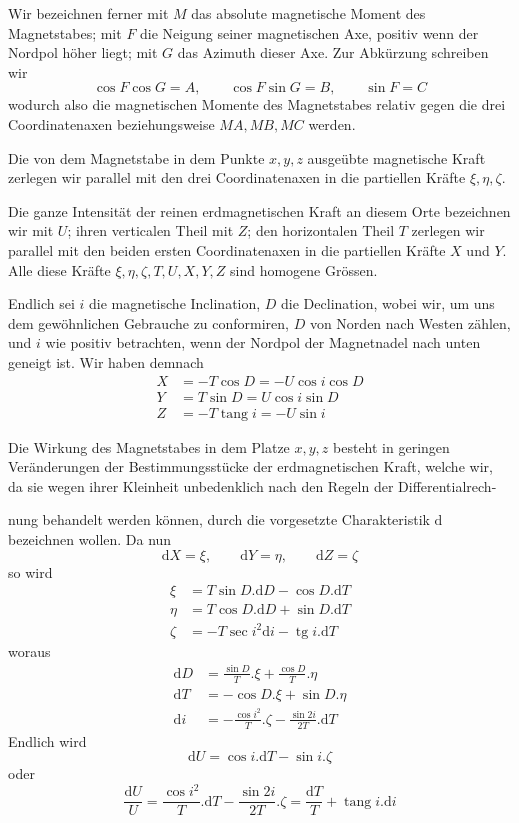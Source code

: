 Wir bezeichnen ferner mit $M$ das absolute magnetische Moment des Magnetstabes; mit $F$ die Neigung seiner magnetischen Axe, positiv wenn der Nordpol höher liegt; mit $G$ das Azimuth dieser Axe. Zur Abkürzung schreiben wir
\[
\cos F\cos G=A,\qquad\cos F\sin G=B,\qquad\sin F=C
\]
wodurch also die magnetischen Momente des Magnetstabes relativ gegen die drei Coordinatenaxen beziehungsweise $MA,MB,MC$ werden.

Die von dem Magnetstabe in dem Punkte $x,y,z$ ausgeübte magnetische Kraft zerlegen wir parallel mit den drei Coordinatenaxen in die partiellen Kräfte $\xi,\eta,\zeta$.

Die ganze Intensität der reinen erdmagnetischen Kraft an diesem Orte bezeichnen wir mit $U$; ihren verticalen Theil mit $Z$; den horizontalen Theil $T$ zerlegen wir parallel mit den beiden ersten Coordinatenaxen in die partiellen Kräfte $X$ und $Y$. Alle diese Kräfte $\xi,\eta,\zeta,T,U,X,Y,Z$ sind homogene Grössen.

Endlich sei $i$ die magnetische Inclination, $D$ die Declination, wobei wir, um uns dem gewöhnlichen Gebrauche zu conformiren, $D$ von Norden nach Westen zählen, und $i$ wie positiv betrachten, wenn der Nordpol der Magnetnadel nach unten geneigt ist. Wir haben demnach
\[
\begin{aligned}
X&=-T\cos D=-U\cos i\cos D\\
Y&=T\sin D=U\cos i\sin D\\
Z&=-T\operatorname{tang}i=-U\sin i
\end{aligned}
\]

Die Wirkung des Magnetstabes in dem Platze $x,y,z$ besteht in geringen Veränderungen der Bestimmungsstücke der erdmagnetischen Kraft, welche wir, da sie wegen ihrer Kleinheit unbedenklich nach den Regeln der Differentialrech-
\par\clearpage
{}
\noindent nung behandelt werden können, durch die vorgesetzte Charakteristik $\mathrm{d}$ bezeichnen wollen. Da nun
\[
\mathrm{d}X=\xi,\qquad\mathrm{d}Y=\eta,\qquad\mathrm{d}Z=\zeta
\]
so wird
\[
\begin{aligned}
\xi&=T\sin D.\mathrm{d}D-\cos D.\mathrm{d}T\\
\eta&=T\cos D.\mathrm{d}D+\sin D.\mathrm{d}T\\
\zeta&=-T\sec i^2\mathrm{d}i-\operatorname{tg}i.\mathrm{d}T
\end{aligned}
\]
woraus
\[
\begin{aligned}
\mathrm{d}D&=\frac{\sin D}{T}.\xi+\frac{\cos D}{T}.\eta\\
\mathrm{d}T&=-\cos D.\xi+\sin D.\eta\\
\mathrm{d}i&=-\frac{\cos i^2}{T}.\zeta-\frac{\sin2i}{2T}.\mathrm{d}T
\end{aligned}
\]
Endlich wird
\[
\mathrm{d}U=\cos i.\mathrm{d}T-\sin i.\zeta
\]
oder
\[
\frac{\mathrm{d}U}{U}=\frac{\cos i^2}{T}.\mathrm{d}T-\frac{\sin2i}{2T}.\zeta=\frac{\mathrm{d}T}{T}+\operatorname{tang}i.\mathrm{d}i
\]

